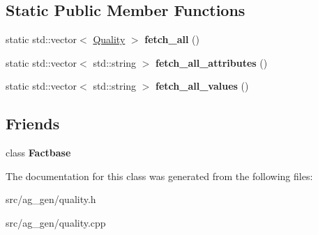 \subsection*{Static Public Member Functions}
\begin{DoxyCompactItemize}
\item 
\mbox{\label{class_quality_a6e2adef9cad716b9496b5c0b94adfc1f}} 
static std\+::vector$<$ \mbox{\hyperlink{class_quality}{Quality}} $>$ {\bfseries fetch\+\_\+all} ()
\item 
\mbox{\label{class_quality_ac3454c44a6c0c9ab01e1fa74ddeb0b05}} 
static std\+::vector$<$ std\+::string $>$ {\bfseries fetch\+\_\+all\+\_\+attributes} ()
\item 
\mbox{\label{class_quality_aeaf962a1b1d4b03f1f0f7b66a95c2e87}} 
static std\+::vector$<$ std\+::string $>$ {\bfseries fetch\+\_\+all\+\_\+values} ()
\end{DoxyCompactItemize}
\subsection*{Friends}
\begin{DoxyCompactItemize}
\item 
\mbox{\label{class_quality_af57acf978b262397fa5d12d64b884bde}} 
class {\bfseries Factbase}
\end{DoxyCompactItemize}


The documentation for this class was generated from the following files\+:\begin{DoxyCompactItemize}
\item 
src/ag\+\_\+gen/quality.\+h\item 
src/ag\+\_\+gen/quality.\+cpp\end{DoxyCompactItemize}
